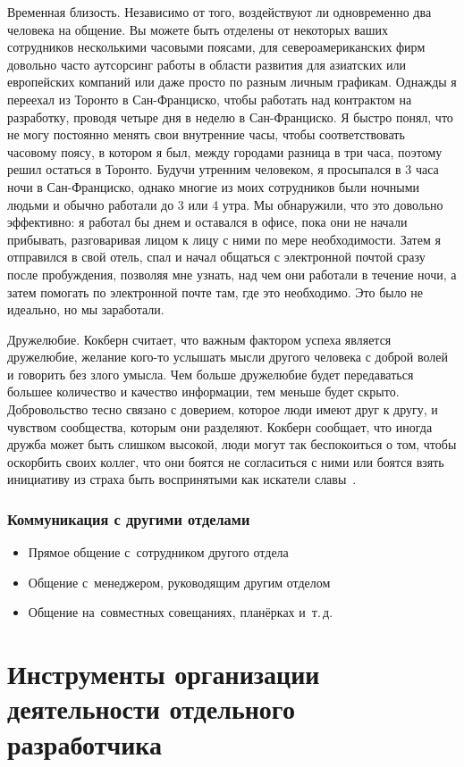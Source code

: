 \documentclass{../industrial-development}
\begin{document}
Временная близость. Независимо от того, воздействуют ли одновременно два человека на общение. Вы можете быть отделены от некоторых ваших сотрудников несколькими часовыми поясами, для североамериканских фирм довольно часто аутсорсинг работы в области развития для азиатских или европейских компаний или даже просто по разным личным графикам. Однажды я переехал из Торонто в Сан-Франциско, чтобы работать над контрактом на разработку, проводя четыре дня в неделю в Сан-Франциско. Я быстро понял, что не могу постоянно менять свои внутренние часы, чтобы соответствовать часовому поясу, в котором я был, между городами разница в три часа, поэтому решил остаться в Торонто. Будучи утренним человеком, я просыпался в 3 часа ночи в Сан-Франциско, однако многие из моих сотрудников были ночными людьми и обычно работали до 3 или 4 утра. Мы обнаружили, что это довольно эффективно: я работал бы днем ​​и оставался в офисе, пока они не начали прибывать, разговаривая лицом к лицу с ними по мере необходимости. Затем я отправился в свой отель, спал и начал общаться с электронной почтой сразу после пробуждения, позволяя мне узнать, над чем они работали в течение ночи, а затем помогать по электронной почте там, где это необходимо. Это было не идеально, но мы заработали.

Дружелюбие. Кокберн считает, что важным фактором успеха является дружелюбие, желание кого-то услышать мысли другого человека с доброй волей и говорить без злого умысла. Чем больше дружелюбие будет передаваться большее количество и качество информации, тем меньше будет скрыто. Добровольство тесно связано с доверием, которое люди имеют друг к другу, и чувством сообщества, которым они разделяют. Кокберн сообщает, что иногда дружба может быть слишком высокой, люди могут так беспокоиться о том, чтобы оскорбить своих коллег, что они боятся не согласиться с ними или боятся взять инициативу из страха быть воспринятыми как искатели славы~\cite{AgileComm}.

\begin{frame} \frametitle{Коммуникация с другими отделами}
  \begin{itemize}
  \item Прямое общение с~сотрудником другого отдела
  \item Общение с~менеджером, руководящим другим отделом
  \item Общение на~совместных совещаниях, планёрках и~т.\,д.
  \end{itemize}
\end{frame}

\section{Инструменты организации деятельности отдельного разработчика}
\end{document}
